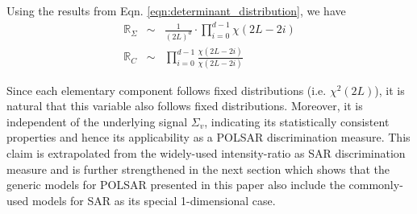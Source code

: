 \documentclass[journal]{IEEEtran}
\begin{document}
Using the results from Eqn. \ref{eqn:determinant_distribution}, %
  we have
\begin{eqnarray}
\mathbb{R}_{\Sigma} &\sim& \frac{1}{(2L)^d} \cdot \prod_{i=0}^{d-1} \chi (2L-2i) \label{eqn:determinant_ratio_distribution} \\
\mathbb{R}_{C} &\sim& \prod_{i=0}^{d-1} \frac{\chi(2L-2i)}{\chi(2L-2i)}
\end{eqnarray}


Since each elementary component follows fixed distributions (i.e. $\chi^2(2L)$),
  it is natural that this variable also follows fixed distributions.
Moreover, it is independent of the underlying signal $\Sigma_v$,
  indicating its statistically consistent properties and hence its applicability as a POLSAR discrimination measure.
  This claim is extrapolated from the widely-used intensity-ratio as SAR discrimination measure and is further strengthened in the next section which shows that the generic models for POLSAR presented in this paper also include the commonly-used models for SAR as its special 1-dimensional case. 
\end{document}
